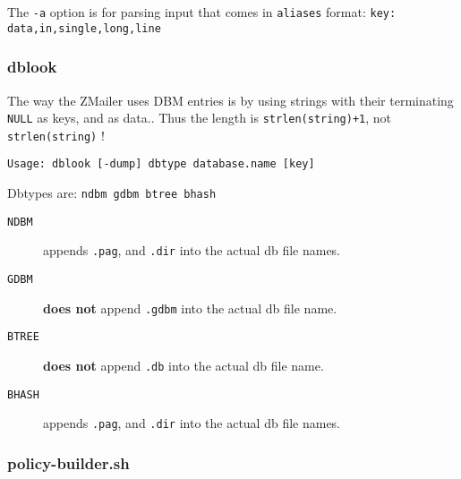 The {\tt -a} option is for parsing input that comes in 
{\tt aliases} format: {\tt key: data,in,single,long,line}




\subsubsection{dblook}



The way the ZMailer uses DBM entries is by using strings with 
their terminating {\tt NULL} as keys, and as data.. Thus the 
length is {\tt strlen(string)+1}, not {\tt strlen(string)} !

\begin{verbatim}
Usage: dblook [-dump] dbtype database.name [key]
\end{verbatim}


Dbtypes are: {\tt ndbm gdbm btree bhash}

\begin{description}
\item[{\tt NDBM}] \mbox{}

appends {\tt .pag}, and {\tt .dir} 
into the actual db file names.

\item[{\tt GDBM}] \mbox{}

{\bf does not} append {\tt .gdbm} 
into the actual db file name.

\item[{\tt BTREE}] \mbox{}

{\bf does not} append {\tt .db} 
into the actual db file name.

\item[{\tt BHASH}] \mbox{}

appends {\tt .pag}, and {\tt .dir} 
into the actual db file names.

\end{description}





\subsubsection{policy-builder.sh}



